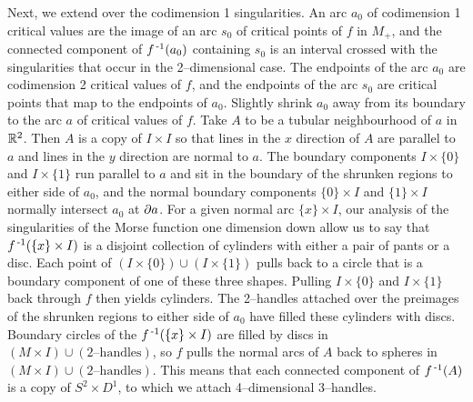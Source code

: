 Next, we extend over the codimension 1 singularities.
An arc $a_0$ of codimension 1 critical values are the image of an arc $s_0$ of critical points of $f$ in $M_+$, and the connected component of $f^{\,\text{-}1} (a_0)$ containing $s_0$ is an interval crossed with the singularities that occur in the 2--dimensional case.
The endpoints of the arc $a_0$ are codimension 2 critical values of $f$, and the endpoints of the arc $s_0$ are critical points that map to the endpoints of $a_0$.
Slightly shrink $a_0$ away from its boundary to the arc $a$ of critical values of $f$.
Take $A$ to be a tubular neighbourhood of $a$ in $\mathbb{R}^2$.
Then $A$ is a copy of $I\times I$ so that lines in the $x$ direction of $A$ are parallel to $a$ and lines in the $y$ direction are normal to $a$.
The boundary components $I\times \{0\}$ and $I\times \{1\}$ run parallel to $a$ and sit in the boundary of the shrunken regions to either side of $a_0$, and the normal boundary components $\{0\}\times I$ and $\{1\}\times I$ normally intersect $a_0$ at $\partial a$.
For a given normal arc $\{x\}\times I$, our analysis of the singularities of the Morse function one dimension down allow us to say that $f^{\,\text{-}1}(\{x\}\times I)$ is a disjoint collection of cylinders with either a pair of pants or a disc.
Each point of $(I\times \{0\})\cup (I\times\{1\})$ pulls back to a circle that is a boundary component of one of these three shapes.
Pulling $I\times \{0\}$ and $I\times\{1\}$ back through $f$ then yields cylinders.
The 2--handles attached over the preimages of the shrunken regions to either side of $a_0$ have filled these cylinders with discs.
Boundary circles of the $f^{\,\text{-}1} (\{x\}\times I)$ are filled by discs in $(M\times I)\cup (2\text{--handles})$, so $f$ pulls the normal arcs of $A$ back to spheres in $(M\times I)\cup (2\text{--handles})$.
This means that each connected component of $f^{\,\text{-}1} (A)$ is a copy of $S^2\times D^1$, to which we attach 4--dimensional 3--handles.

